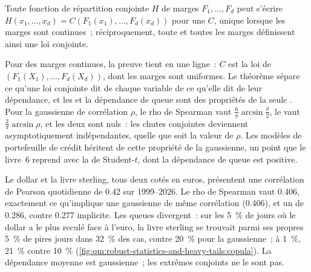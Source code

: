 \begin{theorem}[Sklar]\label{thm:qm:robust-statistics-and-heavy-tails:sklar}
Toute fonction de répartition conjointe $H$ de marges $F_1, \dots, F_d$ peut s'écrire $H(x_1, \dots, x_d) = C(F_1(x_1), \dots, F_d(x_d))$ pour une
 $C$, unique lorsque les marges sont continues~; réciproquement, toute  et toutes les marges définissent ainsi une loi conjointe.
\end{theorem}

Pour des marges continues, la preuve tient en une ligne~: $C$ est la loi de $(F_1(X_1), \dots, F_d(X_d))$, dont les marges sont uniformes. Le théorème
sépare ce qu'une loi conjointe dit de chaque variable de ce qu'elle dit de leur dépendance, et les  et la dépendance de queue
sont des propriétés de la seule . Pour la  gaussienne de corrélation $\rho$, le rho de Spearman vaut $\frac6\pi\arcsin\frac\rho2$, le
 vaut $\frac2\pi\arcsin\rho$, et les deux  sont nuls~: les chutes conjointes deviennent asymptotiquement indépendantes, quelle que soit
la valeur de $\rho$. Les modèles de portefeuille de crédit héritent de cette propriété de la  gaussienne, un point que le livre~6 reprend avec la  de
Student-$t$, dont la dépendance de queue est positive.

Le dollar et la livre sterling, tous deux cotés en euros, présentent une corrélation de Pearson quotidienne de 0.42 sur 1999--2026. Le rho de Spearman vaut 0.406, exactement
ce qu'implique une  gaussienne de même corrélation (0.406), et un  de 0.286, contre 0.277 implicite. Les queues divergent~: sur les
5~\% de jours où le dollar a le plus reculé face à l'euro, la livre sterling se trouvait parmi ses propres 5~\% de pires jours dans 32~\% des cas, contre 20~\% pour la
 gaussienne~; à 1~\%, 21~\% contre 10~\% (\cref{fig:qm:robust-statistics-and-heavy-tails:copula}). La dépendance moyenne est gaussienne~; les
extrêmes conjoints ne le sont pas.

